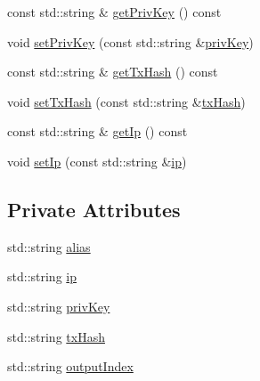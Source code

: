 \begin{DoxyCompactItemize}
\item 
const std\+::string \& \mbox{\hyperlink{class_c_masternode_config_1_1_c_masternode_entry_ab0e21a945e43940b659bf289f9280552}{get\+Priv\+Key}} () const
\item 
void \mbox{\hyperlink{class_c_masternode_config_1_1_c_masternode_entry_a991176f5739043dab17d262a42e7061b}{set\+Priv\+Key}} (const std\+::string \&\mbox{\hyperlink{class_c_masternode_config_1_1_c_masternode_entry_a431935e8b07bd671ea2ec6bbfb81b689}{priv\+Key}})
\item 
const std\+::string \& \mbox{\hyperlink{class_c_masternode_config_1_1_c_masternode_entry_a08039c5a3271a278c64a706c4b53d29b}{get\+Tx\+Hash}} () const
\item 
void \mbox{\hyperlink{class_c_masternode_config_1_1_c_masternode_entry_a32224c906982e19d8b231ed7bc8d27bd}{set\+Tx\+Hash}} (const std\+::string \&\mbox{\hyperlink{class_c_masternode_config_1_1_c_masternode_entry_ac739b69566915fe25fd54bafd3129282}{tx\+Hash}})
\item 
const std\+::string \& \mbox{\hyperlink{class_c_masternode_config_1_1_c_masternode_entry_a50b3672f986b569c83bf29e08f8165c8}{get\+Ip}} () const
\item 
void \mbox{\hyperlink{class_c_masternode_config_1_1_c_masternode_entry_a6dfa8be6875c2718ce05f701158cbbfd}{set\+Ip}} (const std\+::string \&\mbox{\hyperlink{class_c_masternode_config_1_1_c_masternode_entry_a16021f21d3621c37eb163dbe0d79fd35}{ip}})
\end{DoxyCompactItemize}
\subsection*{Private Attributes}
\begin{DoxyCompactItemize}
\item 
std\+::string \mbox{\hyperlink{class_c_masternode_config_1_1_c_masternode_entry_a0e584c7d4597037d0a3af60c2c53bbd7}{alias}}
\item 
std\+::string \mbox{\hyperlink{class_c_masternode_config_1_1_c_masternode_entry_a16021f21d3621c37eb163dbe0d79fd35}{ip}}
\item 
std\+::string \mbox{\hyperlink{class_c_masternode_config_1_1_c_masternode_entry_a431935e8b07bd671ea2ec6bbfb81b689}{priv\+Key}}
\item 
std\+::string \mbox{\hyperlink{class_c_masternode_config_1_1_c_masternode_entry_ac739b69566915fe25fd54bafd3129282}{tx\+Hash}}
\item 
std\+::string \mbox{\hyperlink{class_c_masternode_config_1_1_c_masternode_entry_ac6eef3b3c5009cd124deba0ce81c6951}{output\+Index}}
\end{DoxyCompactItemize}


